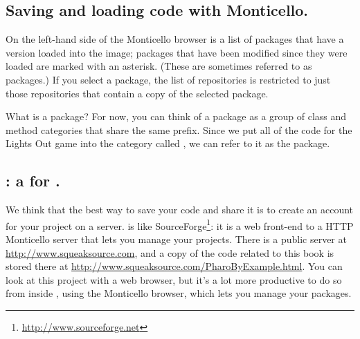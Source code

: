 \documentclass[a4paper,10pt,twoside]{book}
\begin{document}
\subsection{Saving and loading code with Monticello.}
On the left-hand side of the Monticello browser is a list of packages that have a version loaded into the image; packages that have been modified since they were loaded are marked with an asterisk.  (These are sometimes referred to as  packages.)  If you select a package, the list of repositories is restricted to just those repositories that contain a copy of the selected package.

What is a package?  For now, you can think of a package as a group of  class and method categories that share the same prefix.  Since we put all of the code for the Lights Out game into the category called , we can refer to it as the  package.


\subsection{\ind{\sqsrc}: a  for \pharo.} 
We think that the best way to save your code and share it is to create an account for your project on a \sqsrc server. 
\sqsrc is like SourceForge\footnote{\url{http://www.sourceforge.net}}: it is a web front-end to a HTTP Monticello server that lets you manage your projects.
There is a public \sqsrc server at \url{http://www.squeaksource.com}, and a copy of the code related to this book is stored there at \url{http://www.squeaksource.com/PharoByExample.html}. You can look at this project with a web browser, but it's a lot more productive to do so from inside \pharo, using the Monticello browser, which lets you manage your packages.
\end{document}
